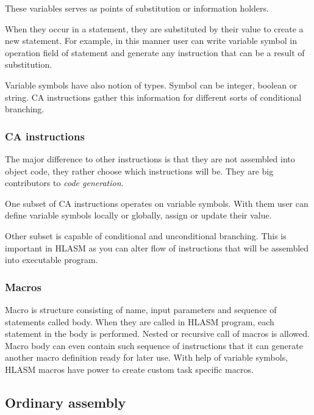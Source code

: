 These variables serves as points of substitution or information holders. 

When they occur in a statement, they are substituted by their value to create a new statement. For example, in this manner user can write variable symbol in operation field of statement and generate any instruction that can be a result of substitution.

Variable symbols have also notion of types. Symbol can be integer, boolean or string. CA instructions gather this information for different sorts of conditional branching.

\subsubsection{CA instructions}

The major difference to other instructions is that they are not assembled into object code, they rather choose which instructions will be. They are big contributors to \textit{code generation}.

One subset of CA instructions operates on variable symbols. With them user can define variable symbols locally or globally, assign or update their value.

Other subset is capable of conditional and unconditional branching. This is important in HLASM as you can alter flow of instructions that will be assembled into executable program.

\subsubsection{Macros}
Macro is structure consisting of name, input parameters and sequence of statements called body. When they are called in HLASM program, each statement in the body is performed. Nested or recursive call of macros is allowed. Macro body can even contain such sequence of instructions that it can generate another macro definition ready for later use. With help of variable symbols, HLASM macros have power to create custom task specific macros.

\subsection{Ordinary assembly}
